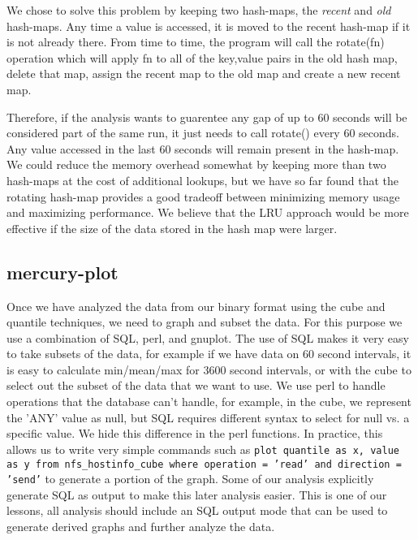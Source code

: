 We chose to solve this problem by keeping two hash-maps, the {\it
recent} and {\it old} hash-maps.  Any time a value is accessed, it is
moved to the recent hash-map if it is not already there.  From time to
time, the program will call the rotate(fn) operation which will apply
fn to all of the key,value pairs in the old hash map, delete that map,
assign the recent map to the old map and create a new recent map.

Therefore, if the analysis wants to guarentee any gap of up to 60
seconds will be considered part of the same run, it just needs to call
rotate() every 60 seconds.  Any value accessed in the last 60 seconds
will remain present in the hash-map.  We could reduce the memory
overhead somewhat by keeping more than two hash-maps at the cost of
additional lookups, but we have so far found that the rotating
hash-map provides a good tradeoff between minimizing memory usage and
maximizing performance.  We believe that the LRU approach would be
more effective if the size of the data stored in the hash map were
larger.

\subsection{mercury-plot}

Once we have analyzed the data from our binary format using the cube
and quantile techniques, we need to graph and subset the data.  For
this purpose we use a combination of SQL, perl, and gnuplot.  The use
of SQL makes it very easy to take subsets of the data, for example if
we have data on 60 second intervals, it is easy to calculate
min/mean/max for 3600 second intervals, or with the cube to select out
the subset of the data that we want to use.  We use perl to handle
operations that the database can't handle, for example, in the cube,
we represent the 'ANY' value as null, but SQL requires different
syntax to select for null vs. a specific value.  We hide this
difference in the perl functions.  In practice, this allows us to
write very simple commands such as {\tt plot quantile as x, value as y
from nfs\_hostinfo\_cube where operation = 'read' and direction =
'send'} to generate a portion of the graph.  Some of our analysis
explicitly generate SQL as output to make this later analysis easier.
This is one of our lessons, all analysis should include an SQL output
mode that can be used to generate derived graphs and further analyze
the data.
